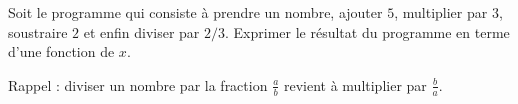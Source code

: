 
\begin{exercice}\label{exoSeconde-0058}

Soit le programme qui consiste à prendre un nombre, ajouter $5$, multiplier par \( 3\), soustraire \( 2\) et enfin diviser par \( 2/3\). Exprimer le résultat du programme en terme d'une fonction de \( x\).

Rappel : diviser un nombre par la fraction \( \frac{ a }{ b }\) revient à multiplier par \( \frac{ b }{ a }\).

\end{exercice}
